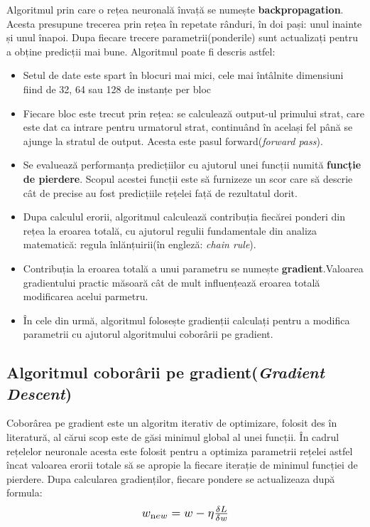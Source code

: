 Algoritmul prin care o rețea neuronală învață se numește \textbf{backpropagation}. Acesta presupune trecerea prin rețea în repetate rânduri, în doi pași: unul inainte și unul înapoi. Dupa fiecare trecere parametrii(ponderile) sunt actualizați pentru a obține predicții mai bune.
Algoritmul poate fi descris astfel:
\begin{itemize}
    \item Setul de date este spart în blocuri mai mici, cele mai întâlnite dimensiuni fiind de 32, 64 sau 128 de instanțe per bloc
    \item Fiecare bloc este trecut prin rețea: se calculează output-ul primului strat, care este dat ca intrare pentru urmatorul strat, continuând în același fel până se ajunge la stratul de output. Acesta este pasul forward(\textit{forward pass}).
    \item Se evaluează performanța predicțiilor cu ajutorul unei funcții numită \textbf{funcție de pierdere}. Scopul acestei funcții este să furnizeze un scor care să descrie cât de precise au fost predicțiile rețelei față de rezultatul dorit. 
    \item Dupa calculul erorii, algoritmul calculează contribuția fiecărei ponderi din rețea la eroarea totală, cu ajutorul regulii fundamentale din analiza matematică: regula înlănțuirii(în engleză: \textit{chain rule}).
    \item Contribuția la eroarea totală a unui parametru se numește \textbf{gradient}.Valoarea gradientului practic măsoară cât de mult influențează eroarea totală modificarea acelui parmetru.
    \item În cele din urmă, algoritmul folosește gradienții calculați pentru a modifica parametrii cu ajutorul algoritmului coborârii pe gradient.
\end{itemize}
\newpage


\subsection{Algoritmul coborârii pe gradient(\textit{Gradient Descent})}
\label{ch:Gradient Descent}
Coborârea pe gradient este un algoritm iterativ de optimizare, folosit des în literatură, al cărui scop este de găsi minimul global al unei funcții. În cadrul rețelelor neuronale acesta este folosit pentru a optimiza parametrii rețelei astfel încat valoarea erorii totale să se apropie la fiecare iterație de minimul funcției de pierdere. Dupa calcularea gradienților, fiecare pondere se actualizeaza după formula: 
\[
    \scalebox{1.2}{$w_{\text new} = w - \eta \frac{\delta L}{\delta w}$}
\]

